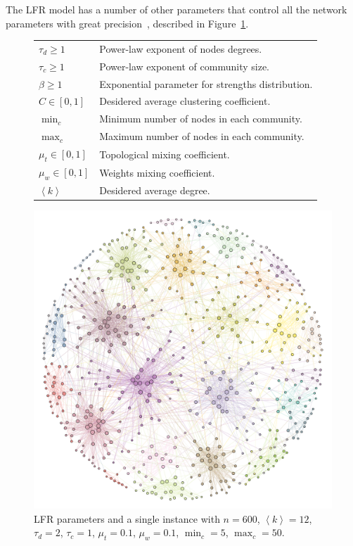 The LFR model has a number of other parameters that control all the network parameters with great precision~\cite{lancichinetti2008,lancichinetti2009a}, described in Figure~\ref{tab:lfrparams}.
\begin{figure}[htb!]\centering
\begin{footnotesize}
\noindent\begin{minipage}[b!]{0.48\textwidth}
\begin{tabular}{l|p{}}
\hline
$\tau_d \geq 1$ & Power-law exponent of nodes degrees.\\
$\tau_c \geq 1$ & Power-law exponent of community size.\\
$\beta \geq 1$  &Exponential parameter for strengths distribution.\\
$C \in [0,1]$ & Desidered average clustering coefficient.\\
$\min_c$ & Minimum number of nodes in each community.\\
$\max_c$  & Maximum number of nodes in each community.\\
$\mu_t \in [0,1]$ & Topological mixing coefficient.\\
$\mu_w \in [0,1]$ & Weights mixing coefficient.\\
$\left<k\right>$ &Desidered average degree.\\
\hline
\end{tabular}
\end{minipage}\hfill
\begin{minipage}[b!]{0.35\textwidth}\flushright
\includegraphics[width=1\textwidth]{images/LFRexample.pdf}
\end{minipage}
\end{footnotesize}
\caption{LFR parameters and a single instance with $n=600$, $\left<k \right>=12$, $\tau_d=2$, $\tau_c=1$, $\mu_t=0.1$, $\mu_w=0.1$, $\min_c=5$, $\max_c=50$.}
\label{tab:lfrparams}
\end{figure}

